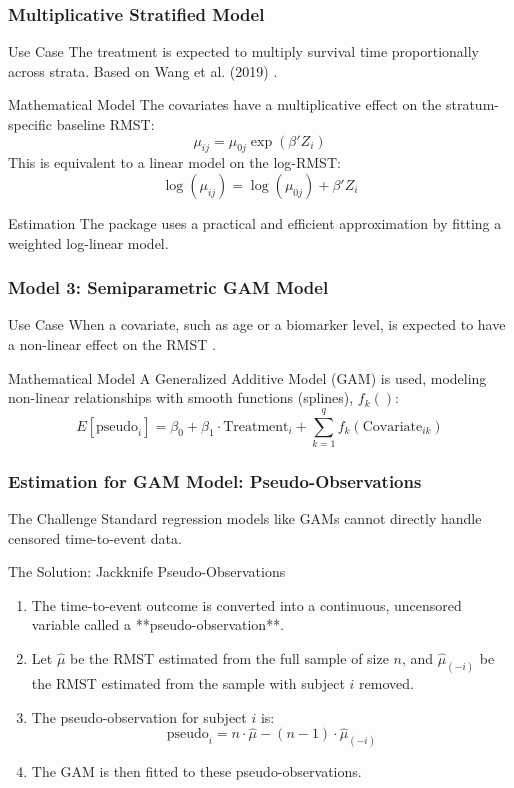 \documentclass{beamer}
\begin{document}
\begin{frame}
\frametitle{Multiplicative Stratified Model}
\begin{block}{Use Case}
The treatment is expected to multiply survival time proportionally across strata. Based on Wang et al. (2019) \cite{[1]}.
\end{block}
\begin{block}{Mathematical Model}
The covariates have a multiplicative effect on the stratum-specific baseline RMST:
$$\mu_{ij} = \mu_{0j} \exp(\beta'Z_i)$$
This is equivalent to a linear model on the log-RMST:
$$\log(\mu_{ij}) = \log(\mu_{0j}) + \beta'Z_i$$
\end{block}
\begin{block}{Estimation}
The package uses a practical and efficient approximation by fitting a weighted log-linear model.
\end{block}
\end{frame}

\begin{frame}
\frametitle{Model 3: Semiparametric GAM Model}
\begin{block}{Use Case}
When a covariate, such as age or a biomarker level, is expected to have a non-linear effect on the RMST \cite{[1]}.
\end{block}
\begin{block}{Mathematical Model}
A Generalized Additive Model (GAM) is used, modeling non-linear relationships with smooth functions (splines), $f_k()$:
$$ E[\text{pseudo}_i] = \beta_0 + \beta_1 \cdot \text{Treatment}_i + \sum_{k=1}^{q} f_k(\text{Covariate}_{ik}) $$
\end{block}
\end{frame}

\begin{frame}
\frametitle{Estimation for GAM Model: Pseudo-Observations}
\begin{block}{The Challenge}
Standard regression models like GAMs cannot directly handle censored time-to-event data.
\end{block}
\begin{block}{The Solution: Jackknife Pseudo-Observations}
\begin{enumerate}
    \item The time-to-event outcome is converted into a continuous, uncensored variable called a **pseudo-observation**.
    \item Let $\hat{\mu}$ be the RMST estimated from the full sample of size $n$, and $\hat{\mu}_{(-i)}$ be the RMST estimated from the sample with subject $i$ removed.
    \item The pseudo-observation for subject $i$ is:
    $$\text{pseudo}_i = n \cdot \hat{\mu} - (n-1) \cdot \hat{\mu}_{(-i)}$$
    \item The GAM is then fitted to these pseudo-observations.
\end{enumerate}
\end{block}
\end{frame}
\end{document}
